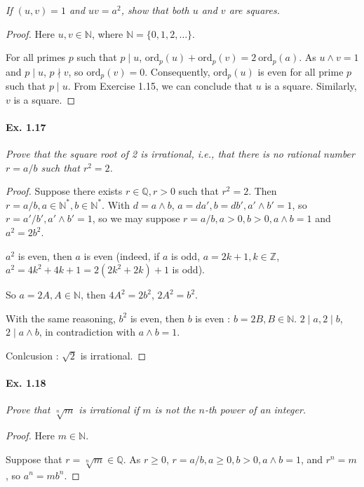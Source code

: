 \documentclass[11pt,a4paper]{article}
\newcommand{\Q}{\mathbb{Q}}
\newcommand{\Z}{\mathbb{Z}}
\newcommand{\N}{\mathbb{N}}
\begin{document}
{{\it If $(u, v) = 1$ and $uv = a^2$, show that both $u$ and $v$ are squares.
}

\begin{proof}
Here $u,v \in \N$, where $\N = \{0,1,2,\ldots\}$.

For all primes $p$ such that $p \mid u$, $\mathrm{ord}_p(u) + \mathrm{ord}_p(v) = 2\  \mathrm{ord}_p(a)$.
As $u\wedge v = 1$ and $p\mid u$, $p \nmid v$, so $\mathrm{ord}_p(v) =0$. Consequently, $\mathrm{ord}_p(u) $ is even for all prime $p$ such that $p \mid u$. From Exercise 1.15, we can conclude that $u$ is a square. Similarly, $v$ is a square.
\end{proof}

\paragraph{Ex. 1.17}

{\it Prove that the square root of 2 is irrational, i.e., that there is no rational number $r = a/b$ such that $r^2 = 2$.
}

\begin{proof}
  Suppose there exists $r \in \Q, r>0$ such that $r^2 = 2$. Then $r = a/b, a \in \N^*, b\in \N^*$. With $d = a\wedge b$, $a = da', b = db', a'\wedge b' = 1$, so $r = a'/b', a' \wedge b' = 1$, so we may suppose $r = a/b , a>0,b>0,a\wedge b = 1$ and $a^2 = 2 b^2$.
  
 $a^2$ is even, then $a$ is even (indeed, if $a$ is odd, $a = 2k+1, k\in \Z$, $a^2 = 4k^2+4k+1 = 2(2k^2+2k) +1$ is odd).
 
 So $a = 2A, A\in \N$, then $4A^2 = 2 b^2$, $2A^2 = b^2$. 
 
 With the same reasoning, $b^2$ is even, then $b$ is even : $b = 2B, B \in \N$. $2\mid a, 2 \mid b$, $2 \mid a\wedge b$,  in contradiction with $a\wedge b = 1$.
 
 Conlcusion  : $\sqrt{2}$ is irrational.
\end{proof}

\paragraph{Ex. 1.18}

{\it Prove that $\sqrt[n]{m}$ is irrational if $m$ is not the $n$-th power of an integer.
}

\begin{proof}
Here $m \in \N$.

Suppose that $r = \sqrt[n]{m} \in \Q$. As $r\geq 0$, $r = a/b, a\geq 0, b >0, a\wedge b = 1$, and $r^n = m$, so $a^n = m b^n$.


\end{proof}}
\end{document}
